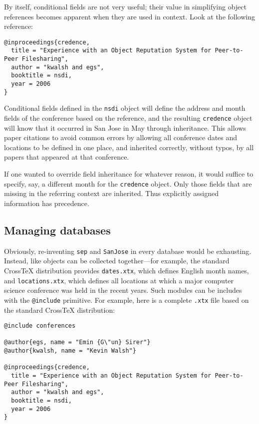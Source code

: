 \documentclass{article}
\newcommand{\XTeX}{Cross\TeX}
\begin{document}
By itself, conditional fields are not very useful; their value in 
simplifying object references becomes apparent when they are used
in context. Look at the following reference:

\begin{small}\begin{verbatim}
@inproceedings{credence,
  title = "Experience with an Object Reputation System for Peer-to-Peer Filesharing",
  author = "kwalsh and egs",
  booktitle = nsdi,
  year = 2006
}
\end{verbatim}\end{small}

Conditional fields defined in the \texttt{nsdi} object will define the
address and month fields of the conference based on the reference, 
and the resulting \texttt{credence} object will know that it occurred
in San Jose in May through inheritance. This allows paper citations
to avoid common errors by allowing all conference dates and locations
to be defined in one place, and inherited correctly, without typos,
by all papers that appeared at that conference. 

If one wanted to override field inheritance for whatever reason, it would suffice to specify, say, a different month for the \texttt{credence} object. Only those fields that are missing in the referring context are inherited. Thus explicitly assigned information has precedence.

\subsection{Managing databases}

Obviously, re-inventing \texttt{sep} and \texttt{SanJose} in every
database would be exhausting. Instead, like objects can be collected
together---for example, the standard \XTeX{} distribution provides 
\texttt{dates.xtx}, which defines English month names, and 
\texttt{locations.xtx}, which defines all locations at which a 
major computer science conference was held in the recent years.
Such modules can be includes with the \texttt{@include} primitive.
For example, here is a complete \texttt{.xtx}
file based on the standard \XTeX{} distribution:

\begin{small}\begin{verbatim}
@include conferences

@author{egs, name = "Emin {G\"un} Sirer"}
@author{kwalsh, name = "Kevin Walsh"}

@inproceedings{credence,
  title = "Experience with an Object Reputation System for Peer-to-Peer Filesharing",
  author = "kwalsh and egs",
  booktitle = nsdi,
  year = 2006
}
\end{verbatim}\end{small}
\end{document}
